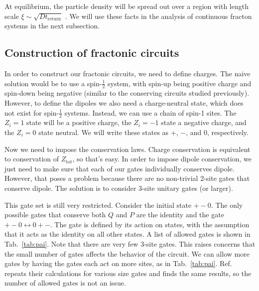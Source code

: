 \documentclass[a4paper,12pt]{article}
\renewcommand{\th}[1]{\frac{1}{#1}}
\newcommand{\ret}{\text{return}}
\newcommand{\note}[1]{{\color{red}{#1}}}
\begin{document}
At equilibrium, the particle density will be spread out over a region with length scale $\xi\sim\sqrt{Dt_\ret}$ \note{(Why?)}. We will use these facts in the analysis of continuous fracton systems in the next subsection.

\subsection{Construction of fractonic circuits} \label{sub:construct}

In order to construct our fractonic circuits, we need to define charges. The naive solution would be to use a spin-$\th{2}$ system, with spin-up being positive charge and spin-down being negative (similar to the conserving circuits studied previously). However, to define the dipoles we also need a charge-neutral state, which does not exist for spin-$\th{2}$ systems. Instead, we can use a chain of spin-1 sites. The $Z_i=1$ state will be a positive charge, the $Z_i=-1$ state a negative charge, and the $Z_i=0$ state neutral. We will write these states as +, $-$, and 0, respectively.

Now we need to impose the conservation laws. Charge conservation is equivalent to conservation of $Z_\text{tot}$, so that's easy. In order to impose dipole conservation, we just need to make sure that each of our gates individually conserves dipole. However, that poses a problem because there are no non-trivial 2-site gates that conserve dipole. The solution is to consider 3-site unitary gates (or larger).

This gate set is still very restricted. Consider the initial state $+-0$. The only possible gates that conserve both $Q$ and $P$ are the identity and the gate $+-0\leftrightarrow 0+-$. The gate is defined by its action on states, with the assumption that it acts as the identity on all other states. A list of allowed gates is shown in Tab.~\ref{tab:pai}. Note that there are very few 3-site gates. This raises concerns that the small number of gates affects the behavior of the circuit. We can allow more gates by having the gates each act on more sites, as in Tab.~\ref{tab:pai}. Ref.~\cite{PaiFracton} repeats their calculations for various size gates and finds the same results, so the number of allowed gates is not an issue.

\end{document}
